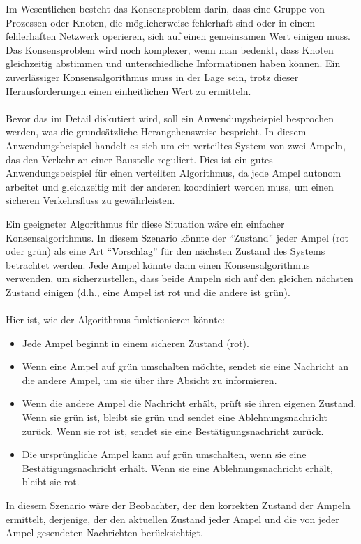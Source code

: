 Im Wesentlichen besteht das Konsensproblem darin, dass eine Gruppe von Prozessen oder Knoten, die möglicherweise fehlerhaft sind oder in einem fehlerhaften Netzwerk operieren, sich auf einen gemeinsamen Wert einigen muss. Das Konsensproblem wird noch komplexer, wenn man bedenkt, dass Knoten gleichzeitig abstimmen und unterschiedliche Informationen haben können. Ein zuverlässiger Konsensalgorithmus muss in der Lage sein, trotz dieser Herausforderungen einen einheitlichen Wert zu ermitteln.
\\\\
Bevor das im Detail diskutiert wird, soll ein Anwendungsbeispiel besprochen werden, was die grundsätzliche Herangehensweise bespricht.  In diesem Anwendungsbeispiel handelt es sich um ein verteiltes System von zwei Ampeln, das den Verkehr an einer Baustelle reguliert. Dies ist ein gutes Anwendungsbeispiel für einen verteilten Algorithmus, da jede Ampel autonom arbeitet und gleichzeitig mit der anderen koordiniert werden muss, um einen sicheren Verkehrsfluss zu gewährleisten.

Ein geeigneter Algorithmus für diese Situation wäre ein einfacher Konsensalgorithmus. In diesem Szenario könnte der \enquote{Zustand} jeder Ampel (rot oder grün) als eine Art \enquote{Vorschlag} für den nächsten Zustand des Systems betrachtet werden. Jede Ampel könnte dann einen Konsensalgorithmus verwenden, um sicherzustellen, dass beide Ampeln sich auf den gleichen nächsten Zustand einigen (d.h., eine Ampel ist rot und die andere ist grün).
\\\\
Hier ist, wie der Algorithmus funktionieren könnte:
\begin{itemize}
\item Jede Ampel beginnt in einem sicheren Zustand (rot).
\item Wenn eine Ampel auf grün umschalten möchte, sendet sie eine Nachricht an die andere Ampel, um sie über ihre Absicht zu informieren.
\item Wenn die andere Ampel die Nachricht erhält, prüft sie ihren eigenen Zustand. Wenn sie grün ist, bleibt sie grün und sendet eine Ablehnungsnachricht zurück. Wenn sie rot ist, sendet sie eine Bestätigungsnachricht zurück.
\item  Die ursprüngliche Ampel kann auf grün umschalten, wenn sie eine Bestätigungsnachricht erhält. Wenn sie eine Ablehnungsnachricht erhält, bleibt sie rot.
\end{itemize}
In diesem Szenario wäre der Beobachter, der den korrekten Zustand der Ampeln ermittelt, derjenige, der den aktuellen Zustand jeder Ampel und die von jeder Ampel gesendeten Nachrichten berücksichtigt.

